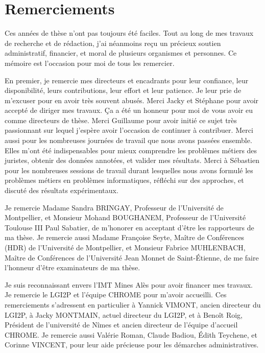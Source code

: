 \chapter*{Remerciements}
\label{sec:acknowledgement}
Ces années de thèse n'ont pas  toujours été faciles. Tout au long de mes travaux de recherche et de rédaction, j'ai néanmoins reçu un précieux soutien administratif, financier, et moral de plusieurs organismes et personnes. Ce mémoire est l'occasion pour moi de tous les remercier.

En premier, je remercie mes directeurs et encadrants pour leur confiance, leur disponibilité, leurs contributions, leur effort et leur patience. Je leur prie de m'excuser pour en avoir  très souvent abusés. Merci Jacky et Stéphane pour avoir accepté de diriger mes travaux. Ça a été un honneur pour moi de vous avoir eu comme directeurs de thèse. Merci Guillaume pour avoir initié ce sujet très passionnant sur lequel j'espère avoir l'occasion de continuer à contribuer. Merci aussi pour les nombreuses journées de travail que nous avons passées ensemble. Elles m'ont été indispensables pour mieux comprendre les problèmes métiers des juristes, obtenir des données annotées, et valider mes résultats. Merci à Sébastien pour les nombreuses sessions de travail durant lesquelles nous avons formulé les problèmes métiers en problèmes informatiques, réfléchi sur des approches, et discuté des résultats expérimentaux. 

Je remercie Madame Sandra BRINGAY, Professeur de l'Université de Montpellier, et 
Monsieur Mohand BOUGHANEM, Professeur de l'Université Toulouse III Paul Sabatier, de m'honorer en acceptant d'être les rapporteurs de ma thèse. Je remercie aussi Madame Françoise Seyte, Maître de Conférences (HDR) de l'Université de Montpellier, et  Monsieur Fabrice MUHLENBACH, Maître de Conférences de l'Université Jean Monnet de Saint-Étienne, de me faire l'honneur d'être examinateurs de ma thèse.

Je suis reconnaissant envers l'IMT Mines Alès pour avoir financer mes travaux. Je remercie le LGI2P et l'équipe CHROME pour m'avoir accueilli. Ces remerciements s'adressent en particulier à Yannick VIMONT, ancien directeur du LGI2P, à Jacky MONTMAIN, actuel directeur du LGI2P, et à Benoît Roig, Président de l'université de Nîmes et ancien directeur de l'équipe d'accueil CHROME. Je remercie aussi Valérie Roman, Claude Badiou, Édith  Teychene, et Corinne VINCENT, pour leur aide précieuse pour les démarches administratives. 

